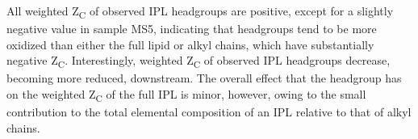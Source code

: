 All weighted Z\textsubscript{C} of observed IPL headgroups are positive, except for a slightly negative value in sample MS5, indicating that headgroups tend to be more oxidized than either the full lipid or alkyl chains, which have substantially negative Z\textsubscript{C}.
Interestingly, weighted Z\textsubscript{C} of observed IPL headgroups decrease, becoming more reduced, downstream. The overall effect that the headgroup has on the weighted Z\textsubscript{C} of the full IPL is minor, however, owing to the small contribution to the total elemental composition of an IPL relative to that of alkyl chains.



